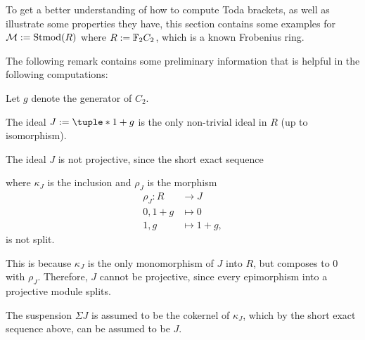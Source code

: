 To get a better understanding of how to compute Toda brackets, as well as illustrate some properties they have, this section contains some examples for \( {\mathcal{M}} := \operatorname{Stmod}(R) \) where \( R := {\mathbb{F}}_2 C_2 \), which is a known Frobenius ring.

The following remark contains some preliminary information that is helpful in the following computations:

\begin{remark}
	\label{rem:toda_bracket_examples_properties}
    Let \( g \) denote the generator of \( C_2 \).

    The ideal \( J := \tuple*{1 + g} \) is the only non-trivial ideal in \( R \) (up to isomorphism).

    The ideal \( J \) is not projective, since the short exact sequence
    \begin{center}
    \end{center}
    where \( \kappa_J \) is the inclusion and \( \rho_J \) is the morphism
    \begin{align*}
        \rho_J: R &\to J \\
        0, 1 + g &\mapsto 0 \\
        1, g &\mapsto 1 + g,
    \end{align*}
    is not split.

    This is because \( \kappa_J \) is the only monomorphism of \( J \) into \( R \), but composes to \( 0 \) with \( \rho_J \). Therefore, \( J \) cannot be projective, since every epimorphism into a projective module splits.

    The suspension \( \Sigma J \) is assumed to be the cokernel of \( \kappa_J \), which by the short exact sequence above, can be assumed to be \( J \).

\end{remark}

